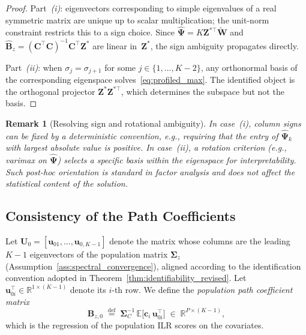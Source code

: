 \documentclass{article}
\newtheorem{remark}{Remark}
\begin{document}
\begin{proof}
Part~\emph{(i)}: eigenvectors corresponding to simple eigenvalues of a
real symmetric matrix are unique up to scalar multiplication; the
unit-norm constraint restricts this to a sign choice.
Since $\hat{\boldsymbol{\Psi}} = K\mathbf{Z}^{*\top}
\widetilde{\mathbf{W}}$ and $\hat{\mathbf{B}}_z
= (\mathbf{C}^{\!\top}\mathbf{C})^{-1}\mathbf{C}^{\!\top}\mathbf{Z}^*$
are linear in~$\mathbf{Z}^*$, the sign ambiguity propagates directly.

Part~\emph{(ii)}: when $\sigma_j=\sigma_{j+1}$ for some
$j\in\{1,\dots,K{-}2\}$, any orthonormal basis of the corresponding
eigenspace solves~\eqref{eq:profiled_max}. The identified object is
the orthogonal projector
$\mathbf{Z}^*\mathbf{Z}^{*\top}$, which determines the subspace but
not the basis.
\end{proof}

\begin{remark}[Resolving sign and rotational ambiguity]
\label{rem:resolving_ambiguity}
In case~\emph{(i)}, column signs can be fixed by a deterministic
convention, e.g., requiring that the entry of $\hat{\boldsymbol{\Psi}}_k$
with largest absolute value is positive. In case~\emph{(ii)}, a rotation
criterion (e.g., varimax on $\hat{\boldsymbol{\Psi}}$) selects a
specific basis within the eigenspace for interpretability. Such post-hoc
orientation is standard in factor analysis and does not affect the
statistical content of the solution.
\end{remark}


\subsection{Consistency of the Path Coefficients}
\label{subsec:consistency}

Let $\mathbf{U}_0 = [\mathbf{u}_{01},\dots,\mathbf{u}_{0,K-1}]$
denote the matrix whose columns are the leading $K{-}1$ eigenvectors
of the population matrix $\boldsymbol{\Sigma}_z$
(Assumption~\ref{ass:spectral_convergence}), aligned according to the
identification convention adopted in
Theorem~\ref{thm:identifiability_revised}. Let
$\mathbf{u}_{0i}^{\!\top}\in\mathbb{R}^{1\times(K-1)}$ denote its
$i$-th row. We define the \emph{population path coefficient matrix}
\begin{equation}
  \mathbf{B}_{z,0}
  \;\stackrel{\text{def}}{=}\;
  \boldsymbol{\Sigma}_C^{-1}\,
  \mathbb{E}\!\bigl[\mathbf{c}_i\,\mathbf{u}_{0i}^{\!\top}\bigr]
  \;\in\;\mathbb{R}^{P\times(K-1)},
  \label{eq:Bz0_def}
\end{equation}
which is the regression of the population ILR scores on the covariates.
\end{document}
